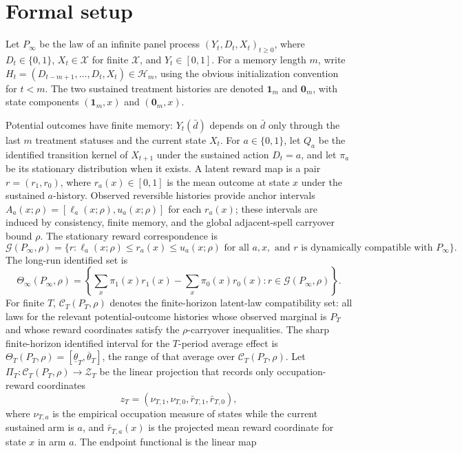\documentclass[11pt]{article}
\newcommand{\calH}{\mathcal{H}}
\theoremstyle{definition}
\theoremstyle{plain}
\theoremstyle{remark}
\begin{document}
\section{Formal setup}
Let \(P_{\infty}\) be the law of an infinite panel process \((Y_t,D_t,X_t)_{t\ge0}\), where \(D_t\in\{0,1\}\), \(X_t\in\mathcal X\) for finite \(\mathcal X\), and \(Y_t\in[0,1]\).  For a memory length \(m\), write \(H_t=(D_{t-m+1},\ldots,D_t,X_t)\in\calH_m\), using the obvious initialization convention for \(t<m\).  The two sustained treatment histories are denoted \(\mathbf 1_m\) and \(\mathbf 0_m\), with state components \((\mathbf 1_m,x)\) and \((\mathbf 0_m,x)\).

Potential outcomes have finite memory: \(Y_t(\bar d)\) depends on \(\bar d\) only through the last \(m\) treatment statuses and the current state \(X_t\).  For \(a\in\{0,1\}\), let \(Q_a\) be the identified transition kernel of \(X_{t+1}\) under the sustained action \(D_t=a\), and let \(\pi_a\) be its stationary distribution when it exists.  A latent reward map is a pair \(r=(r_1,r_0)\), where \(r_a(x)\in[0,1]\) is the mean outcome at state \(x\) under the sustained \(a\)-history.  Observed reversible histories provide anchor intervals \(A_a(x;\rho)=[\ell_a(x;\rho),u_a(x;\rho)]\) for each \(r_a(x)\); these intervals are induced by consistency, finite memory, and the global adjacent-spell carryover bound \(\rho\).  The stationary reward correspondence is
\[
\mathcal G(P_{\infty},\rho)
=\{r:\ell_a(x;\rho)\le r_a(x)\le u_a(x;\rho)
  \text{ for all }a,x,\text{ and }r\text{ is dynamically compatible with }P_{\infty}\}.
\]
The long-run identified set is
\[
\Theta_{\infty}(P_{\infty},\rho)
=\left\{\sum_x\pi_1(x)r_1(x)-\sum_x\pi_0(x)r_0(x):
  r\in\mathcal G(P_{\infty},\rho)\right\}.
\]
For finite \(T\), \(\mathcal C_T(P_T,\rho)\) denotes the finite-horizon latent-law compatibility set: all laws for the relevant potential-outcome histories whose observed marginal is \(P_T\) and whose reward coordinates satisfy the \(\rho\)-carryover inequalities.  The sharp finite-horizon identified interval for the \(T\)-period average effect is
\(\Theta_T(P_T,\rho)=[\underline\theta_T,\overline\theta_T]\), the range of that average over \(\mathcal C_T(P_T,\rho)\).  Let \(\Pi_T:\mathcal C_T(P_T,\rho)\to\mathcal Z_T\) be the linear projection that records only occupation-reward coordinates
\[
z_T=(\nu_{T,1},\nu_{T,0},\bar r_{T,1},\bar r_{T,0}),
\]
where \(\nu_{T,a}\) is the empirical occupation measure of states while the current sustained arm is \(a\), and \(\bar r_{T,a}(x)\) is the projected mean reward coordinate for state \(x\) in arm \(a\).  The endpoint functional is the linear map
\end{document}
